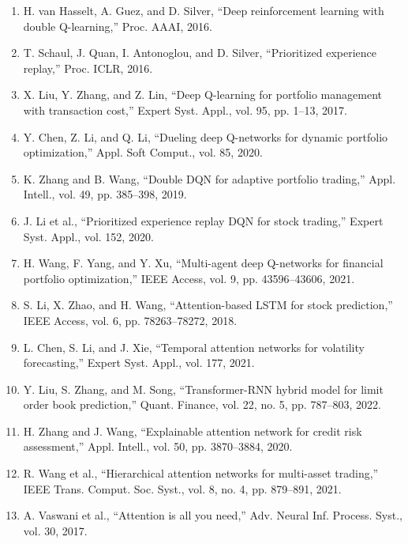 \documentclass[11pt]{article}
\begin{document}
\begin{enumerate}
\item H. van Hasselt, A. Guez, and D. Silver, ``Deep reinforcement learning with double Q-learning,'' Proc. AAAI, 2016.

\item T. Schaul, J. Quan, I. Antonoglou, and D. Silver, ``Prioritized experience replay,'' Proc. ICLR, 2016.

\item X. Liu, Y. Zhang, and Z. Lin, ``Deep Q-learning for portfolio management with transaction cost,'' Expert Syst. Appl., vol. 95, pp. 1--13, 2017.

\item Y. Chen, Z. Li, and Q. Li, ``Dueling deep Q-networks for dynamic portfolio optimization,'' Appl. Soft Comput., vol. 85, 2020.

\item K. Zhang and B. Wang, ``Double DQN for adaptive portfolio trading,'' Appl. Intell., vol. 49, pp. 385--398, 2019.

\item J. Li et al., ``Prioritized experience replay DQN for stock trading,'' Expert Syst. Appl., vol. 152, 2020.

\item H. Wang, F. Yang, and Y. Xu, ``Multi-agent deep Q-networks for financial portfolio optimization,'' IEEE Access, vol. 9, pp. 43596--43606, 2021.

\item S. Li, X. Zhao, and H. Wang, ``Attention-based LSTM for stock prediction,'' IEEE Access, vol. 6, pp. 78263--78272, 2018.

\item L. Chen, S. Li, and J. Xie, ``Temporal attention networks for volatility forecasting,'' Expert Syst. Appl., vol. 177, 2021.

\item Y. Liu, S. Zhang, and M. Song, ``Transformer-RNN hybrid model for limit order book prediction,'' Quant. Finance, vol. 22, no. 5, pp. 787--803, 2022.

\item H. Zhang and J. Wang, ``Explainable attention network for credit risk assessment,'' Appl. Intell., vol. 50, pp. 3870--3884, 2020.

\item R. Wang et al., ``Hierarchical attention networks for multi-asset trading,'' IEEE Trans. Comput. Soc. Syst., vol. 8, no. 4, pp. 879--891, 2021.

\item A. Vaswani et al., ``Attention is all you need,'' Adv. Neural Inf. Process. Syst., vol. 30, 2017.


\end{enumerate}
\end{document}
